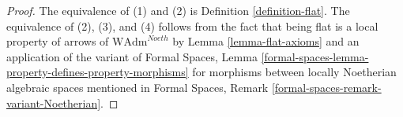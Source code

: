\documentclass[10pt,a4paper]{amsart}
\theoremstyle{plain}
\theoremstyle{definition}
\theoremstyle{remark}
\numberwithin{equation}{subsection}
\begin{document}
\begin{proof}
The equivalence of (1) and (2) is Definition \ref{definition-flat}.
The equivalence of (2), (3), and (4) follows from the fact that
being flat is a local property of arrows of
$\text{WAdm}^{Noeth}$ by Lemma \ref{lemma-flat-axioms}
and an application of the variant of
Formal Spaces, Lemma
\ref{formal-spaces-lemma-property-defines-property-morphisms}
for morphisms between locally Noetherian algebraic spaces
mentioned in
Formal Spaces, Remark
\ref{formal-spaces-remark-variant-Noetherian}.
\end{proof}
\end{document}
